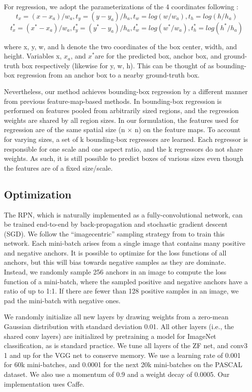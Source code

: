For regression, we adopt the parameterizations of the 4 coordinates following :
\[t_{x} = (x - x_{a}) / w_{a}, t_{y} = (y - y_{a}) / h_{a} , t_{w} = log(w / w_{a}) , t_{h} = log(h / h_{a})\]
\[t_{x}^{*} = (x^{*} - x_{a}) / w_{a}, t_{y}^{*} = (y^{*} - y_{a}) / h_{a} , t_{w}^{*} = log(w^{*} / w_{a}) , t_{h}^{*} = log(h^{*} / h_{a})\]


where x, y, w, and h denote the two coordinates of the box center, width, and height. Variables x, $x_{a}$, and $x^{*}$are for the predicted box, anchor box, and ground-truth box respectively (likewise for y, w, h). This can be thought of as bounding-box regression from an anchor box to a nearby ground-truth box.

Nevertheless, our method achieves bounding-box regression by a different manner from previous
feature-map-based methods. In bounding-box regression is performed on features
pooled from arbitrarily sized regions, and the regression weights are shared by all region sizes. In
our formulation, the features used for regression are of the same spatial size (n $\times$ n) on the feature
maps. To account for varying sizes, a set of k bounding-box regressors are learned. Each regressor
is responsible for one scale and one aspect ratio, and the k regressors do not share weights. As such,
it is still possible to predict boxes of various sizes even though the features are of a fixed size/scale.

\subsection{Optimization}
The RPN, which is naturally implemented as a fully-convolutional network, can be trained
end-to-end by back-propagation and stochastic gradient descent (SGD). We follow the “imagecentric” sampling strategy from to train this network. Each mini-batch arises from a single image
that contains many positive and negative anchors. It is possible to optimize for the loss functions of
all anchors, but this will bias towards negative samples as they are dominate. Instead, we randomly
sample 256 anchors in an image to compute the loss function of a mini-batch, where the sampled
positive and negative anchors have a ratio of up to 1:1. If there are fewer than 128 positive samples
in an image, we pad the mini-batch with negative ones.

We randomly initialize all new layers by drawing weights from a zero-mean Gaussian distribution with standard deviation 0.01. All other layers (i.e., the shared conv layers) are initialized by pretraining a model for ImageNet classification, as is standard practice. We tune all layers of the ZF net, and conv3 1 and up for the VGG net to conserve memory. We use a learning rate of 0.001 for 60k mini-batches, and 0.0001 for the next 20k mini-batches on the PASCAL dataset. We also use a momentum of 0.9 and a weight decay of 0.0005. Our implementation uses Caffe.

